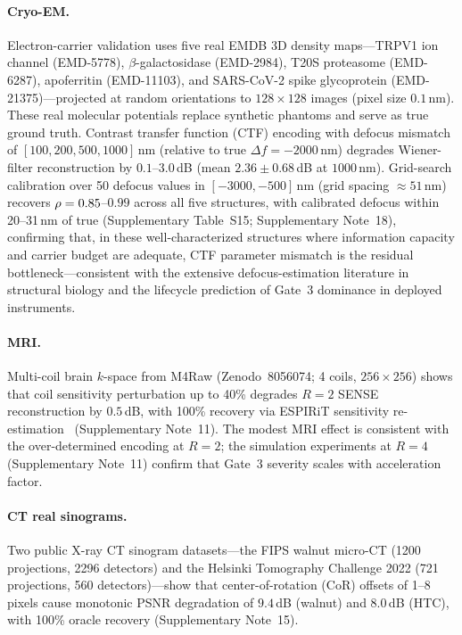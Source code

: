 \paragraph{Cryo-EM.}
Electron-carrier validation uses five real EMDB 3D density maps---TRPV1 ion channel (EMD-5778), $\beta$-galactosidase (EMD-2984), T20S proteasome (EMD-6287), apoferritin (EMD-11103), and SARS-CoV-2 spike glycoprotein (EMD-21375)---projected at random orientations to $128 \times 128$ images (pixel size $0.1$\,nm). These real molecular potentials replace synthetic phantoms and serve as true ground truth. Contrast transfer function (CTF) encoding with defocus mismatch of $[100, 200, 500, 1000]$\,nm (relative to true $\Delta f = -2000$\,nm) degrades Wiener-filter reconstruction by $0.1$--$3.0$\,dB (mean $2.36 \pm 0.68$\,dB at $1000$\,nm). Grid-search calibration over 50 defocus values in $[-3000, -500]$\,nm (grid spacing ${\approx}51$\,nm) recovers $\rho = 0.85$--$0.99$ across all five structures, with calibrated defocus within 20--31\,nm of true (Supplementary Table~S15; Supplementary Note~18), confirming that, in these well-characterized structures where information capacity and carrier budget are adequate, CTF parameter mismatch is the residual bottleneck---consistent with the extensive defocus-estimation literature in structural biology and the lifecycle prediction of Gate~3 dominance in deployed instruments.

\paragraph{MRI.}
Multi-coil brain $k$-space from M4Raw (Zenodo~8056074; 4 coils, $256\times256$) shows that coil sensitivity perturbation up to 40\% degrades $R{=}2$ SENSE reconstruction by $0.5$\,dB, with 100\% recovery via ESPIRiT sensitivity re-estimation~\cite{uecker2014espirit} (Supplementary Note~11). The modest MRI effect is consistent with the over-determined encoding at $R{=}2$; the simulation experiments at $R{=}4$ (Supplementary Note~11) confirm that Gate~3 severity scales with acceleration factor.

\paragraph{CT real sinograms.}
Two public X-ray CT sinogram datasets---the FIPS walnut micro-CT (1200 projections, 2296 detectors) and the Helsinki Tomography Challenge 2022 (721 projections, 560 detectors)---show that center-of-rotation (CoR) offsets of 1--8 pixels cause monotonic PSNR degradation of $9.4$\,dB (walnut) and $8.0$\,dB (HTC), with 100\% oracle recovery (Supplementary Note~15).

